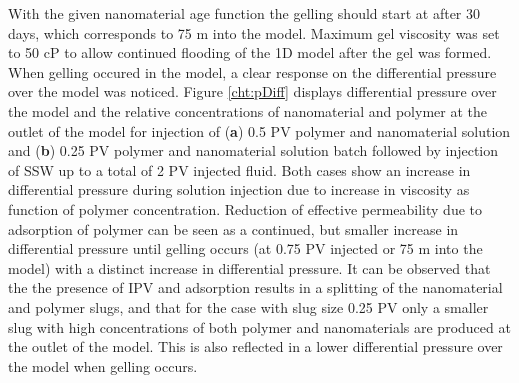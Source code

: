 \documentclass[nanomaterials,article,submit,moreauthors,pdftex]{Definitions/mdpi}
\begin{document}
With the given nanomaterial age function the gelling should start at after 30 days, which corresponds to 75 m into the model. Maximum gel viscosity was set to 50 cP to allow continued flooding of the 1D model after the gel was formed. When gelling occured in the model, a clear response on the differential pressure over the model was noticed. Figure \ref{cht:pDiff} displays differential pressure over the model and the relative concentrations of nanomaterial and polymer at the outlet of the model for injection of (\textbf{a}) 0.5 PV polymer and nanomaterial solution and (\textbf{b}) 0.25 PV polymer and nanomaterial solution batch followed by injection of SSW up to a total of 2 PV injected fluid. Both cases show an increase in differential pressure during solution injection due to increase in viscosity as function of polymer concentration. Reduction of effective permeability due to adsorption of polymer can be seen as a continued, but smaller increase in differential pressure until gelling occurs (at 0.75 PV injected or 75 m into the model) with a distinct increase in differential pressure. It can be observed that the the presence of IPV and adsorption results in a splitting of the nanomaterial and polymer slugs, and that for the case with slug size 0.25 PV only a smaller slug with high concentrations of both polymer and nanomaterials are produced at the outlet of the model. This is also reflected in a lower differential pressure over the model when gelling occurs. 
\end{document}
